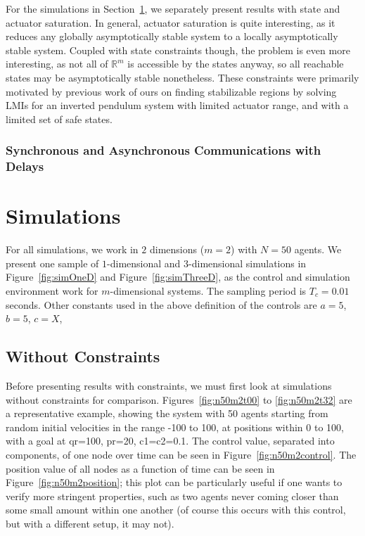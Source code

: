 \documentclass[10pt, conference, compsocconf]{IEEEtran}
\begin{document}
For the simulations in Section~\ref{sec:simulations}, we separately present results with state and actuator saturation.
%
In general, actuator saturation is quite interesting, as it reduces any globally asymptotically stable system to a locally asymptotically stable system.
%
Coupled with state constraints though, the problem is even more interesting, as not all of $\mathbb{R}^m$ is accessible by the states anyway, so all reachable states may be asymptotically stable nonetheless.
%
These constraints were primarily motivated by previous work of ours on finding stabilizable regions by solving LMIs for an inverted pendulum system with limited actuator range, and with a limited set of safe states.

\subsubsection{Synchronous and Asynchronous Communications with Delays}


\section{Simulations}
\label{sec:simulations}

For all simulations, we work in $2$ dimensions ($m=2$) with $N=50$ agents.
%
We present one sample of $1$-dimensional and $3$-dimensional simulations in Figure~\ref{fig:simOneD} and Figure~\ref{fig:simThreeD}, as the control and simulation environment work for $m$-dimensional systems.
%
The sampling period is $T_c = 0.01$ seconds.  Other constants used in the above definition of the controls are $a=5$, $b=5$, $c=X$, 

\subsection{Without Constraints}

Before presenting results with constraints, we must first look at simulations without constraints for comparison.  Figures~\ref{fig:n50m2t00} to \ref{fig:n50m2t32} are a representative example, showing the system with 50 agents starting from random initial velocities in the range -100 to 100, at positions within 0 to 100, with a goal at qr=100, pr=20, c1=c2=0.1.
%
The control value, separated into components, of one node over time can be seen in Figure~\ref{fig:n50m2control}.
%
The position value of all nodes as a function of time can be seen in Figure~\ref{fig:n50m2position}; this plot can be particularly useful if one wants to verify more stringent properties, such as two agents never coming closer than some small amount within one another (of course this occurs with this control, but with a different setup, it may not).
\end{document}
